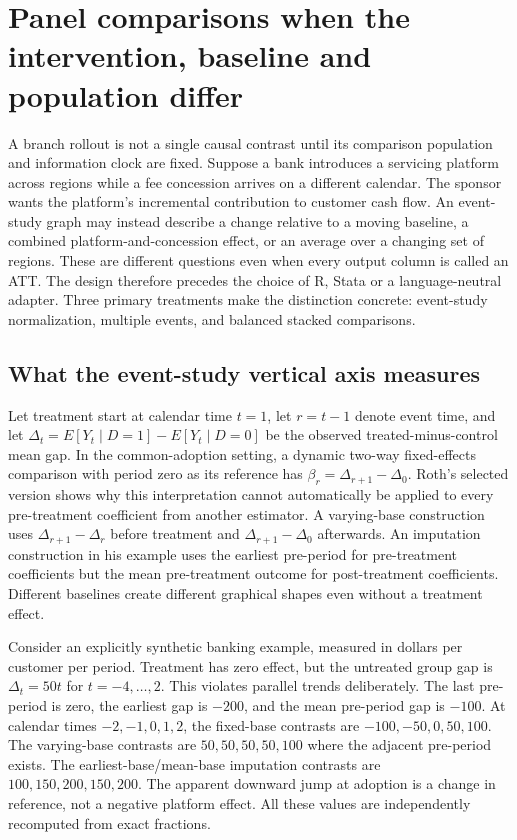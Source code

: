 \section{Panel comparisons when the intervention, baseline and population differ}
\label{sec:exec28-panel-designs}

A branch rollout is not a single causal contrast until its comparison population and information clock are fixed.
Suppose a bank introduces a servicing platform across regions while a fee concession arrives on a different calendar.
The sponsor wants the platform's incremental contribution to customer cash flow. An event-study graph may instead describe
a change relative to a moving baseline, a combined platform-and-concession effect, or an average over a changing set of regions.
These are different questions even when every output column is called an ATT. The design therefore precedes the choice of R,
Stata or a language-neutral adapter. Three primary treatments make the distinction concrete: event-study normalization,
multiple events, and balanced stacked comparisons.~\citep{exec28_panel_roth,exec28_panel_tsai,exec28_panel_wing}

\subsection{What the event-study vertical axis measures}

Let treatment start at calendar time $t=1$, let $r=t-1$ denote event time, and let
$\Delta_t=E[Y_t\mid D=1]-E[Y_t\mid D=0]$ be the observed treated-minus-control mean gap.
In the common-adoption setting, a dynamic two-way fixed-effects comparison with period zero as its reference has
$\beta_r=\Delta_{r+1}-\Delta_0$. Roth's selected version shows why this interpretation cannot automatically be applied
to every pre-treatment coefficient from another estimator. A varying-base construction uses $\Delta_{r+1}-\Delta_r$
before treatment and $\Delta_{r+1}-\Delta_0$ afterwards. An imputation construction in his example uses the earliest
pre-period for pre-treatment coefficients but the mean pre-treatment outcome for post-treatment coefficients.
Different baselines create different graphical shapes even without a treatment effect.~\citep{exec28_panel_roth}

Consider an explicitly synthetic banking example, measured in dollars per customer per period. Treatment has zero effect,
but the untreated group gap is $\Delta_t=50t$ for $t=-4,\ldots,2$. This violates parallel trends deliberately. The last
pre-period is zero, the earliest gap is $-200$, and the mean pre-period gap is $-100$. At calendar times $-2,-1,0,1,2$,
the fixed-base contrasts are $-100,-50,0,50,100$. The varying-base contrasts are $50,50,50,50,100$ where the adjacent
pre-period exists. The earliest-base/mean-base imputation contrasts are $100,150,200,150,200$.
The apparent downward jump at adoption is a change in reference, not a negative platform effect. All these values
are independently recomputed from exact fractions.~\citep{exec28_panel_reference}

